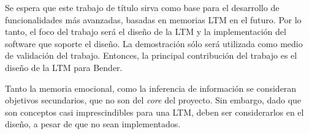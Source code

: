 Se espera que este trabajo de título sirva como base para el desarrollo de funcionalidades más avanzadas, basadas en memorias LTM en el futuro. Por lo tanto, el foco del trabajo será el diseño de la LTM y la implementación del software que soporte el diseño. La demostración sólo será utilizada como medio de validación del trabajo. Entonces, la principal contribución del trabajo es el diseño de la LTM para Bender.

Tanto la memoria emocional, como la inferencia de información se consideran objetivos secundarios, que no son del \textit{core} del proyecto. Sin embargo, dado que son conceptos casi imprescindibles para una LTM, deben ser considerarlos en el diseño, a pesar de que no sean implementados.



